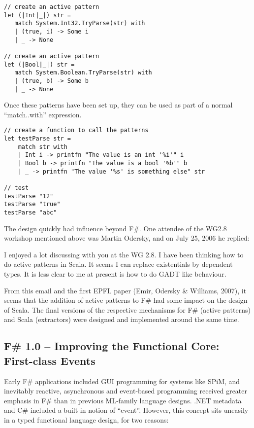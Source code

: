 \documentclass[acmsmall,review]{acmart}\settopmatter{printfolios=true,printccs=false,printacmref=false}
\begin{document}
\begin{verbatim}
// create an active pattern
let (|Int|_|) str =
   match System.Int32.TryParse(str) with
   | (true, i) -> Some i
   | _ -> None

// create an active pattern
let (|Bool|_|) str =
   match System.Boolean.TryParse(str) with
   | (true, b) -> Some b
   | _ -> None
\end{verbatim}

Once these patterns have been set up, they can be used as part of a normal “match..with” expression.

\begin{verbatim}
// create a function to call the patterns
let testParse str = 
    match str with
    | Int i -> printfn "The value is an int '%i'" i
    | Bool b -> printfn "The value is a bool '%b'" b
    | _ -> printfn "The value '%s' is something else" str

// test
testParse "12"
testParse "true"
testParse "abc"
\end{verbatim}

The design quickly had influence beyond F\#. One attendee of the WG2.8 workshop mentioned above was Martin Odersky, and on July 25, 2006 he replied:

\begin{verbquote}
I enjoyed a lot discussing with you at the WG 2.8. I have been thinking how to do active patterns in Scala. It seems I can replace existentials by dependent types. It is less clear to me at present is how to do GADT like behaviour. 
\end{verbquote}


From this email and the first EPFL paper (Emir, Odersky \& Williams, 2007), it seems that the addition of active patterns to F\# had some impact on the design of Scala. The final versions of the respective mechanisms for F\# (active patterns) and Scala (extractors) were designed and implemented around the same time.    


\subsection*{F\# 1.0 – Improving the Functional Core: First-class Events}

Early F\# applications included GUI programming for systems like SPiM, and inevitably reactive, asynchronous and event-based programming received greater emphasis in F\# than in previous ML-family language designs. .NET metadata and C\# included a built-in notion of “event”. However, this concept sits uneasily in a typed functional language design, for two reasons:
\end{document}
